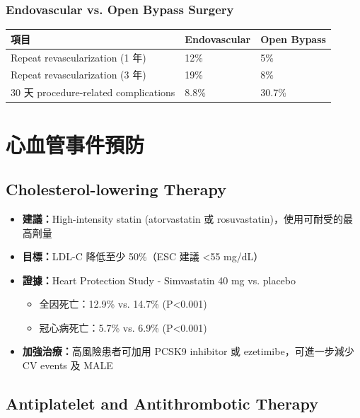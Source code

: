 \documentclass[12pt,a4paper]{article}
\begin{document}
\subsubsection{Endovascular vs. Open Bypass Surgery}

\begin{longtable}{p{5cm}p{4cm}p{4cm}}
\toprule
\textbf{項目} & \textbf{Endovascular} & \textbf{Open Bypass} \\
\midrule
\endfirsthead
Repeat revascularization (1 年) & 12\% & 5\% \\
\midrule
Repeat revascularization (3 年) & 19\% & 8\% \\
\midrule
30 天 procedure-related complications & 8.8\% & 30.7\% \\
\bottomrule
\end{longtable}

\section{心血管事件預防}

\subsection{Cholesterol-lowering Therapy}

\begin{itemize}[leftmargin=2em]
    \item \textbf{建議：}High-intensity statin (atorvastatin 或 rosuvastatin)，使用可耐受的最高劑量
    \item \textbf{目標：}LDL-C 降低至少 50\%（ESC 建議 <55 mg/dL）
    \item \textbf{證據：}Heart Protection Study - Simvastatin 40 mg vs. placebo
    \begin{itemize}
        \item 全因死亡：12.9\% vs. 14.7\% (P<0.001)
        \item 冠心病死亡：5.7\% vs. 6.9\% (P<0.001)
    \end{itemize}
    \item \textbf{加強治療：}高風險患者可加用 PCSK9 inhibitor 或 ezetimibe，可進一步減少 CV events 及 MALE
\end{itemize}

\subsection{Antiplatelet and Antithrombotic Therapy}
\end{document}
